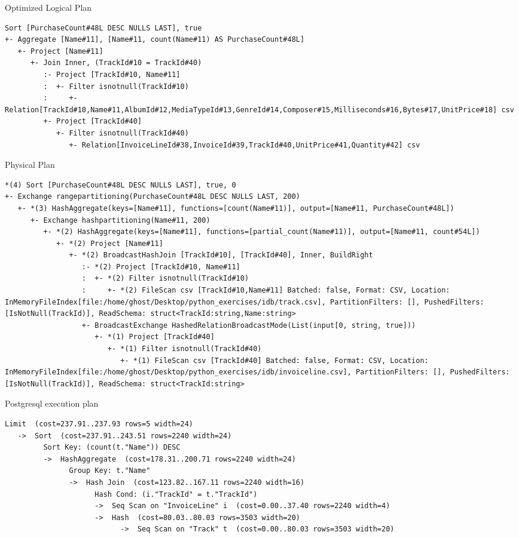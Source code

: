 \begin{exercise}{9}
\begin{subexercise}
    Optimized Logical Plan
    \begin{lstlisting}[breaklines=true]
    Sort [PurchaseCount#48L DESC NULLS LAST], true
+- Aggregate [Name#11], [Name#11, count(Name#11) AS PurchaseCount#48L]
   +- Project [Name#11]
      +- Join Inner, (TrackId#10 = TrackId#40)
         :- Project [TrackId#10, Name#11]
         :  +- Filter isnotnull(TrackId#10)
         :     +- Relation[TrackId#10,Name#11,AlbumId#12,MediaTypeId#13,GenreId#14,Composer#15,Milliseconds#16,Bytes#17,UnitPrice#18] csv
         +- Project [TrackId#40]
            +- Filter isnotnull(TrackId#40)
               +- Relation[InvoiceLineId#38,InvoiceId#39,TrackId#40,UnitPrice#41,Quantity#42] csv
    \end{lstlisting}

    Physical Plan
    \begin{lstlisting}[breaklines=true]
    *(4) Sort [PurchaseCount#48L DESC NULLS LAST], true, 0
+- Exchange rangepartitioning(PurchaseCount#48L DESC NULLS LAST, 200)
   +- *(3) HashAggregate(keys=[Name#11], functions=[count(Name#11)], output=[Name#11, PurchaseCount#48L])
      +- Exchange hashpartitioning(Name#11, 200)
         +- *(2) HashAggregate(keys=[Name#11], functions=[partial_count(Name#11)], output=[Name#11, count#54L])
            +- *(2) Project [Name#11]
               +- *(2) BroadcastHashJoin [TrackId#10], [TrackId#40], Inner, BuildRight
                  :- *(2) Project [TrackId#10, Name#11]
                  :  +- *(2) Filter isnotnull(TrackId#10)
                  :     +- *(2) FileScan csv [TrackId#10,Name#11] Batched: false, Format: CSV, Location: InMemoryFileIndex[file:/home/ghost/Desktop/python_exercises/idb/track.csv], PartitionFilters: [], PushedFilters: [IsNotNull(TrackId)], ReadSchema: struct<TrackId:string,Name:string>
                  +- BroadcastExchange HashedRelationBroadcastMode(List(input[0, string, true]))
                     +- *(1) Project [TrackId#40]
                        +- *(1) Filter isnotnull(TrackId#40)
                           +- *(1) FileScan csv [TrackId#40] Batched: false, Format: CSV, Location: InMemoryFileIndex[file:/home/ghost/Desktop/python_exercises/idb/invoiceline.csv], PartitionFilters: [], PushedFilters: [IsNotNull(TrackId)], ReadSchema: struct<TrackId:string>
    \end{lstlisting}

    Postgresql execution plan
    \begin{lstlisting}[breaklines=true]
      Limit  (cost=237.91..237.93 rows=5 width=24)
   ->  Sort  (cost=237.91..243.51 rows=2240 width=24)
         Sort Key: (count(t."Name")) DESC
         ->  HashAggregate  (cost=178.31..200.71 rows=2240 width=24)
               Group Key: t."Name"
               ->  Hash Join  (cost=123.82..167.11 rows=2240 width=16)
                     Hash Cond: (i."TrackId" = t."TrackId")
                     ->  Seq Scan on "InvoiceLine" i  (cost=0.00..37.40 rows=2240 width=4)
                     ->  Hash  (cost=80.03..80.03 rows=3503 width=20)
                           ->  Seq Scan on "Track" t  (cost=0.00..80.03 rows=3503 width=20)
    \end{lstlisting}
    \end{subexercise}


\end{exercise}
